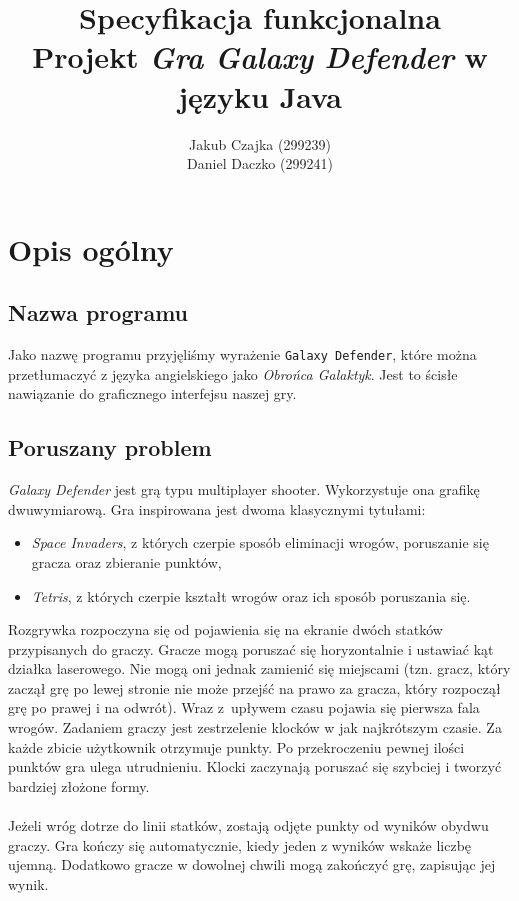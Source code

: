 \documentclass[a4paper]{article}
\title{Specyfikacja funkcjonalna\\Projekt \textit{Gra Galaxy Defender} w języku Java}
\author{Jakub Czajka (299239)\\Daniel Daczko (299241)}
\newcommand{\prog}{\texttt}
\begin{document}
\maketitle
\tableofcontents
\thispagestyle{empty}

\section{Opis ogólny}

\subsection{Nazwa programu}
Jako nazwę programu przyjęliśmy wyrażenie \prog{Galaxy Defender}, które można przetłumaczyć z języka angielskiego jako \textit{Obrońca Galaktyk}. Jest to ścisłe nawiązanie do graficznego interfejsu naszej gry.

\subsection{Poruszany problem}
\textit{Galaxy Defender} jest grą typu multiplayer shooter. Wykorzystuje ona grafikę dwuwymiarową. Gra inspirowana jest dwoma klasycznymi tytułami:
\begin{itemize}
    \item \textit{Space Invaders}, z których czerpie sposób eliminacji wrogów, poruszanie się gracza oraz zbieranie punktów,
    \item \textit{Tetris}, z których czerpie kształt wrogów oraz ich sposób poruszania się.
\end{itemize}
Rozgrywka rozpoczyna się od pojawienia się na ekranie dwóch statków przypisanych do graczy. Gracze mogą poruszać się horyzontalnie i ustawiać kąt działka laserowego. Nie mogą oni jednak zamienić się miejscami (tzn. gracz, który zaczął grę po lewej stronie nie może przejść na prawo za gracza, który rozpoczął grę po prawej i na odwrót). Wraz z~upływem czasu pojawia się pierwsza fala wrogów.
Zadaniem graczy jest zestrzelenie klocków w jak najkrótszym czasie. Za każde zbicie użytkownik otrzymuje punkty. Po przekroczeniu pewnej ilości punktów gra ulega utrudnieniu.
Klocki zaczynają poruszać się szybciej i tworzyć bardziej złożone formy.\\ \\
Jeżeli wróg dotrze do linii statków, zostają odjęte punkty od wyników obydwu graczy. Gra kończy się automatycznie, kiedy jeden z wyników wskaże liczbę ujemną. 
Dodatkowo gracze w dowolnej chwili mogą zakończyć grę, zapisując jej wynik.
\end{document}
